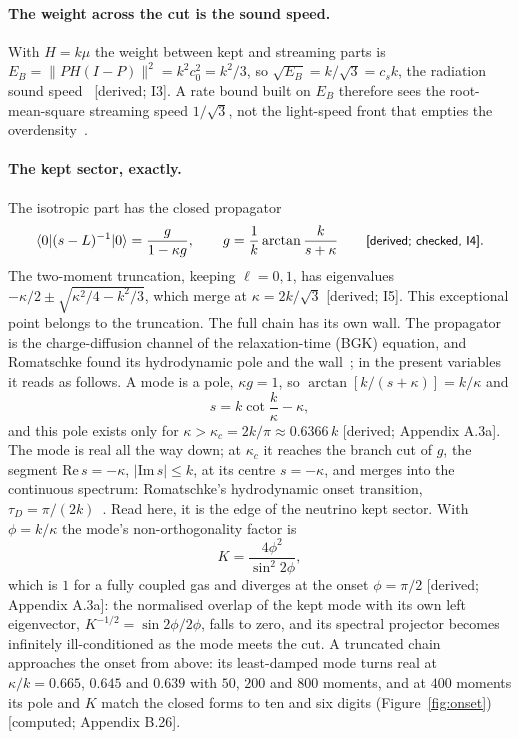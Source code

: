 \documentclass[11pt]{article}
\newcommand{\grade}[1]{\textsf{\small[#1]}}
\begin{document}
\paragraph{The weight across the cut is the sound speed.} With $H=k\mu$ the weight between kept and streaming parts is $E_B=\lVert PH(I-P)\rVert^2=k^2c_0^2=k^2/3$, so $\sqrt{E_B}=k/\sqrt3=c_s k$, the radiation sound speed~\cite{WB} \grade{derived; I3}. A rate bound built on $E_B$ therefore sees the root-mean-square streaming speed $1/\sqrt3$, not the light-speed front that empties the overdensity~\cite{OSL}.

\paragraph{The kept sector, exactly.} The isotropic part has the closed propagator
\begin{equation}
\langle0|(s-L)^{-1}|0\rangle=\frac{g}{1-\kappa g},\qquad g=\frac1k\arctan\frac{k}{s+\kappa}\qquad\text{\grade{derived; checked, I4}}.
\end{equation}
The two-moment truncation, keeping $\ell=0,1$, has eigenvalues $-\kappa/2\pm\sqrt{\kappa^2/4-k^2/3}$, which merge at $\kappa=2k/\sqrt3$ \grade{derived; I5}. This exceptional point belongs to the truncation. The full chain has its own wall. The propagator is the charge-diffusion channel of the relaxation-time (BGK) equation, and Romatschke found its hydrodynamic pole and the wall~\cite[Eq.~(37)]{Rom}; in the present variables it reads as follows. A mode is a pole, $\kappa g=1$, so $\arctan[k/(s+\kappa)]=k/\kappa$ and
\begin{equation}
s=k\cot\frac{k}{\kappa}-\kappa,
\end{equation}
and this pole exists only for $\kappa>\kappa_c=2k/\pi\approx0.6366\,k$ \grade{derived; Appendix A.3a}. The mode is real all the way down; at $\kappa_c$ it reaches the branch cut of $g$, the segment $\mathrm{Re}\,s=-\kappa$, $|\mathrm{Im}\,s|\le k$, at its centre $s=-\kappa$, and merges into the continuous spectrum: Romatschke's hydrodynamic onset transition, $\tau_D=\pi/(2k)$~\cite{Rom,Hu}. Read here, it is the edge of the neutrino kept sector. With $\phi=k/\kappa$ the mode's non-orthogonality factor is
\begin{equation}
K=\frac{4\phi^2}{\sin^2 2\phi},
\end{equation}
which is $1$ for a fully coupled gas and diverges at the onset $\phi=\pi/2$ \grade{derived; Appendix A.3a}: the normalised overlap of the kept mode with its own left eigenvector, $K^{-1/2}=\sin2\phi/2\phi$, falls to zero, and its spectral projector becomes infinitely ill-conditioned as the mode meets the cut. A truncated chain approaches the onset from above: its least-damped mode turns real at $\kappa/k=0.665$, $0.645$ and $0.639$ with $50$, $200$ and $800$ moments, and at $400$ moments its pole and $K$ match the closed forms to ten and six digits (Figure~\ref{fig:onset}) \grade{computed; Appendix B.26}.
\end{document}
